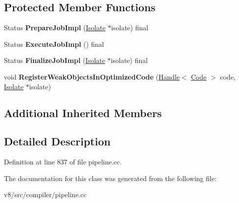 \subsection*{Protected Member Functions}
\begin{DoxyCompactItemize}
\item 
\mbox{\label{classv8_1_1internal_1_1compiler_1_1PipelineCompilationJob_aaa2c9c4ddeb9b0fdc813f6af1bafcf23}} 
Status {\bfseries Prepare\+Job\+Impl} (\mbox{\hyperlink{classv8_1_1internal_1_1Isolate}{Isolate}} $\ast$isolate) final
\item 
\mbox{\label{classv8_1_1internal_1_1compiler_1_1PipelineCompilationJob_a1d26636ace817167381295494d25641a}} 
Status {\bfseries Execute\+Job\+Impl} () final
\item 
\mbox{\label{classv8_1_1internal_1_1compiler_1_1PipelineCompilationJob_af6121595a603af6b11f88d67743e79b4}} 
Status {\bfseries Finalize\+Job\+Impl} (\mbox{\hyperlink{classv8_1_1internal_1_1Isolate}{Isolate}} $\ast$isolate) final
\item 
\mbox{\label{classv8_1_1internal_1_1compiler_1_1PipelineCompilationJob_a64bbfc04ee0150acc1062c3f56c99437}} 
void {\bfseries Register\+Weak\+Objects\+In\+Optimized\+Code} (\mbox{\hyperlink{classv8_1_1internal_1_1Handle}{Handle}}$<$ \mbox{\hyperlink{classv8_1_1internal_1_1Code}{Code}} $>$ code, \mbox{\hyperlink{classv8_1_1internal_1_1Isolate}{Isolate}} $\ast$isolate)
\end{DoxyCompactItemize}
\subsection*{Additional Inherited Members}


\subsection{Detailed Description}


Definition at line 837 of file pipeline.\+cc.



The documentation for this class was generated from the following file\+:\begin{DoxyCompactItemize}
\item 
v8/src/compiler/pipeline.\+cc\end{DoxyCompactItemize}
